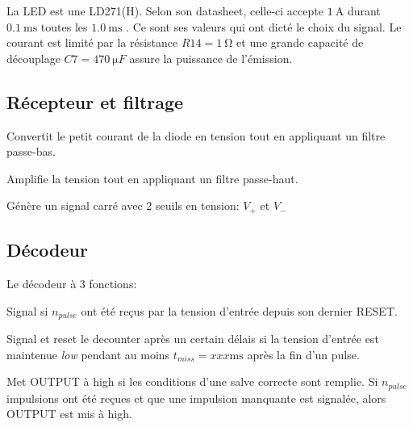 \documentclass[french]{layout/Report}
\begin{document}
La LED est une LD271(H). Selon son datasheet, celle-ci accepte $\SI{1}{\ampere}$ durant $\SI{0.1}{\milli\second}$ toutes les $\SI{1.0}{\milli\second}$ \cite{LD271(H)}. Ce sont ses valeurs qui ont dicté le choix du signal. Le courant est limité par la résistance $R14 = \SI{1}{\ohm}$ et une grande capacité de découplage $C7=\SI{470}{\micro F}$ assure la puissance de l'émission.



\subsection{Récepteur et filtrage}
\begin{description}[leftmargin=!,labelwidth=5cm, labelindent=\parindent]
	\item[Conversion \& low-pass] Convertit le petit courant de la diode en tension tout en appliquant un filtre passe-bas.
	\item[Amplification \& high-pass] Amplifie la tension tout en appliquant un filtre passe-haut.
	\item[Schmidt trigger] Génère un signal carré avec 2 seuils en tension: $V_+$ et $V_-$
\end{description}

\subsection{Décodeur}
Le décodeur à 3 fonctions:

\begin{description}[leftmargin=!,labelwidth=4cm, labelindent=\parindent]
	\item[Decounter] Signal si $n_{pulse}$ ont été reçus par la tension d'entrée depuis son dernier RESET.
	\item[Missing pulse detector] Signal et reset le decounter après un certain délais si la tension d'entrée est maintenue \emph{low} pendant au moins $t_{miss} = xxx \si{\milli\second}$ après la fin d'un pulse.
	\item[Logic] Met OUTPUT à high si les conditions d'une salve correcte sont remplie. Si $n_{pulse}$ impulsions ont été reçues et que une impulsion manquante est signalée, alors OUTPUT est mis à high. 
\end{description}
\end{document}

